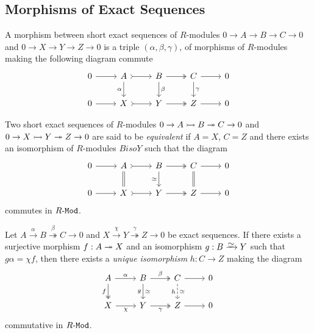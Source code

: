\subsection{Morphisms of Exact Sequences}

\begin{definition}
    \label{def:morphism-short-exact-sequences}
    A morphism between short exact sequences of \(R\)-modules
    \(0 \to A \to B \to C \to 0\) and \(0 \to X \to Y \to Z \to 0\) is a triple
    \((\alpha, \beta, \gamma)\), of morphisms of \(R\)-modules making the following
    diagram commute
    \[
        \begin{tikzcd}
            0 \ar[r] &A \ar[r, tail] \ar[d, "\alpha"']
            &B \ar[r, two heads] \ar[d, "\beta"]
            &C \ar[r] \ar[d, "\gamma"]
            &0 \\
            0 \ar[r] &X \ar[r, tail] &Y \ar[r, two heads] &Z \ar[r] &0
        \end{tikzcd}
    \]
\end{definition}

\begin{definition}
    \label{def:equivalent-short-exact-sequences}
    Two short exact sequences of \(R\)-modules \(0 \to A \rightarrowtail B \twoheadrightarrow C \to 0\) and \(0 \to X \rightarrowtail Y
    \twoheadrightarrow Z \to 0\) are said to be \emph{equivalent} if \(A = X\), \(C = Z\) and
    there exists an isomorphism of \(R\)-modules \(B iso Y\) such that the diagram
    \[
        \begin{tikzcd}
            0 \ar[r] &A \ar[r, tail] \ar[d, equal]
            &B \ar[r, two heads] \ar[d, "\dis"']
            &C \ar[r] \ar[d, equal]
            &0 \\
            0 \ar[r]
            &X \ar[r, tail]
            &Y \ar[r, two heads]
            &Z \ar[r]
            &0
        \end{tikzcd}
    \]
    commutes in \({R\text{-}\texttt{Mod}}\).
\end{definition}

\begin{proposition}
    \label{prop:unique-isomorphism-exact-sequences-right}
    Let \(A \xrightarrow \alpha B \overset{\beta}\twoheadrightarrow C \to 0\) and
    \(X \xrightarrow{\chi} Y \overset{\gamma}\twoheadrightarrow Z \to 0\) be exact
    sequences. If there exists a surjective morphism \(f: A \twoheadrightarrow X\) and an
    isomorphism \(g: B \isoto Y\) such that \(g \alpha = \chi f\), then there exists
    a \emph{unique isomorphism} \(h: C \to Z\) making the diagram
    \[
        \begin{tikzcd}
            A \ar[r, "\alpha"] \ar[d, two heads, "f"']
            &B \ar[r, two heads, "\beta"] \ar[d, "g"', "\dis"]
            &C \ar[r] \ar[d, dashed, "h"', "\dis"]
            &0 \\
            X \ar[r, "\chi"'] &Y \ar[r, two heads, "\gamma"'] &Z \ar[r] &0
        \end{tikzcd}
    \]
    commutative in \({R\text{-}\texttt{Mod}}\).
\end{proposition}

